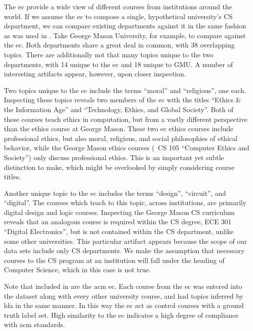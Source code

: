 
The \ac{ec} provide a wide view of different courses from institutions around the world.
If we assume the \ac{ec} to compose a single, hypothetical university's CS department, we can compare existing departments against it in the same fashion as was used in .
Take George Mason University, for example, to compare against the \ac{ec}.
Both departments share a great deal in common, with 38 overlapping topics.
There are additionally not that many topics unique to the two departments, with 14 unique to the \ac{ec} and 18 unique to GMU.
A number of interesting artifacts appear, however, upon closer inspection.


Two topics unique to the \ac{ec} include the terms ``moral'' and ``religious'', one each.
Inspecting these topics reveals two members of the \ac{ec} with the titles ``Ethics \& the Information Age'' and ``Technology, Ethics, and Global Society''.
Both of these courses teach ethics in computation, but from a vastly different perspective than the ethics course at George Mason.
These two \ac{ec} ethics courses include professional ethics, but also moral, religious, and social philosophies of ethical behavior, while the George Mason ethics courses (\eg\ CS 105 ``Computer Ethics and Society'') only discuss professional ethics.
This is an important yet subtle distinction to make, which might be overlooked by simply considering course titles.


Another unique topic to the \ac{ec} includes the terms ``design'', ``circuit'', and ``digital''.
The courses which teach to this topic, across institutions, are primarily digital design and logic courses.
Inspecting the George Mason CS curriculum reveals that an analogous course is required within the CS degree, ECE 301 ``Digital Electronics'', but is not contained within the CS department, unlike some other universities.
This particular artifact appears because the scope of our data sets include only CS departments.
We make the assumption that necessary courses to the CS program at an institution will fall under the heading of Computer Science, which in this case is not true.


Note that included in  are the \ac{acm} \ac{ec}.
Each course from the \ac{ec} was entered into the dataset along with every other university course, and had topics inferred by \ac{lda} in the same manner.
In this way the \ac{ec} act as control courses with a ground truth label set.
High similarity to the \ac{ec} indicates a high degree of compliance with \ac{acm} standards.


